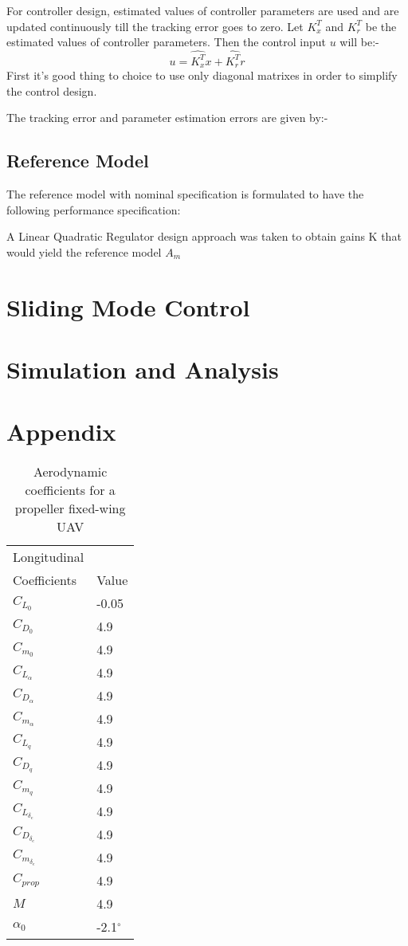 \documentclass[12pt]{article}
\begin{document}
For controller design, estimated values of controller parameters are used and are updated continuously till the tracking error goes to zero. Let $K_{x}^T$ and $K_{r}^T$ be the estimated values of controller parameters. Then the control input $u$ will
be:-
\begin{equation}
    u =  \hat{K_x^T} x +  \hat{K_r^T} r
    \label{eq: control input w/ param est.}
\end{equation}
First it’s good thing to choice to use only diagonal matrixes in order to simplify the control 
design. 

The tracking error and parameter estimation errors are given
by:-

\subsection{Reference Model}
The reference model with nominal specification is formulated to have the following performance specification:

A Linear Quadratic Regulator design approach was taken to obtain gains K that would yield the reference model $A_m$
\section{Sliding Mode Control}

\section{Simulation and Analysis}


\section{Appendix}
\begin{table}
\centering
\begin{tabular}{ll}
 Longitudinal \\
 Coefficients & Value \\\hline

$C_{L_0}$ & -0.05 \\
$C_{D_0}$ & 4.9 \\
$C_{m_0}$ & 4.9 \\
$C_{L_\alpha}$ & 4.9 \\
$C_{D_\alpha}$ & 4.9 \\
$C_{m_\alpha}$ & 4.9 \\
$C_{L_q}$ & 4.9 \\
$C_{D_q}$ & 4.9 \\
$C_{m_q}$ & 4.9 \\
$C_{L_\delta_e}$ & 4.9 \\
$C_{D_{\delta_e}}$  & 4.9 \\
$C_{m_{\delta_e}}$ & 4.9 \\
$C_{prop}$ & 4.9 \\
$M$ & 4.9 \\
$\alpha_0$ & -2.1$^\circ$ \\
\end{tabular}
\caption{Aerodynamic coefficients for a propeller fixed-wing UAV}
\label{tab:aero_coeffs}
\end{table}
\end{document}
